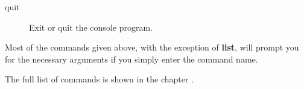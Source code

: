 \begin{description}


\item [quit]
   Exit or quit the console program.
\end{description}

Most of the commands given above, with the exception of {\bf list}, will
prompt you for the necessary arguments if you simply enter the command name.

The full list of commands is shown in the chapter .